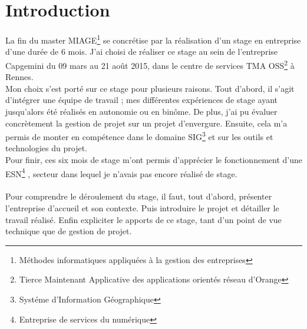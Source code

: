 \chapter*{Introduction}
La fin du master MIAGE\footnote{Méthodes informatiques appliquées à la gestion des entreprises}
se concrétise par la réalisation d’un stage en entreprise d’une durée de 6 mois.
J’ai choisi de réaliser ce stage au sein de l’entreprise Capgemini du 09 mars au 21 août 2015,
dans le centre de services TMA OSS\footnote{Tierce Maintenant Applicative des applications orientés réseau d'Orange} à Rennes.
\\Mon choix s’est porté sur ce stage pour plusieurs raisons. Tout d’abord, il s’agit d’intégrer
une équipe de travail ; mes différentes expériences de stage ayant jusqu’alors été réalisés en
autonomie ou en binôme. De plus, j’ai pu évaluer concrètement la gestion de projet sur un
projet d’envergure. Ensuite, cela m’a permis de monter en compétence dans le domaine SIG\footnote{Systéme d'Information Géographique} et
sur les outils et technologies du projet.
\\Pour finir, ces six mois de stage m’ont permis d’apprécier le
fonctionnement d’une ESN\footnote{Entreprise de services du numérique}
, secteur dans lequel je n’avais pas encore réalisé de stage.
\\\\

Pour comprendre le déroulement du stage, il faut, tout d’abord, présenter l’entreprise d'accueil et son contexte.
Puis introduire le projet et détailler le travail réalisé.
Enfin expliciter le apports de ce stage, tant d’un point de vue technique que de gestion de projet.
